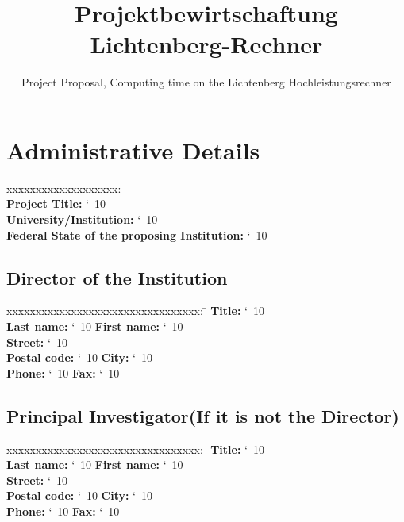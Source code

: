 \documentclass[accentcolor=tud9c,nochapname,11pt]{tudexercise}
\makeatletter
\newcommand\saferead[1]{%
  \bgroup
  \let\do\@makeother
  \dospecials\catcode`\ 10
  \egroup 
}
\makeatother
\begin{document}
\title{Projektbewirtschaftung \\ Lichtenberg-Rechner}
\subtitle{Project Proposal, Computing time on the Lichtenberg Hochleistungsrechner}
\maketitle
\section{Administrative Details}
\begin{Form}
\begin{tabbing}
xxxxxxxxxxxxxxxxxxx: \= \kill  \\%
\textbf{Project Title:}  \saferead{proj_title.txt} \\
\textbf{University/Institution:}  \saferead{prop_inst.txt} \\
\textbf{Federal State of the proposing Institution:}  \saferead{prop_state.txt} \\
\end{tabbing}
\subsection{Director of the Institution}
\begin{tabbing}
xxxxxxxxxxxxxxxxxxxxxxxxxxxxxxxxx:  \= \kill
\textbf{Title:}   \saferead{dir_title.txt} \\
\textbf{Last name:} \saferead{dir_lname.txt}  \> \>  \textbf{First name:} \saferead{dir_fname.txt}  \\
\textbf{Street:} \saferead{dir_street.txt}  \\
\textbf{Postal code:} \saferead{dir_pcode.txt}  \> \> \textbf{City:} \saferead{dir_city.txt}  \\
\textbf{Phone:} \saferead{dir_phone.txt} \> \> \textbf{Fax:} \saferead{dir_fax.txt}  \\
\end{tabbing}
\subsection{Principal Investigator(If it is not the Director)}
\begin{tabbing}
xxxxxxxxxxxxxxxxxxxxxxxxxxxxxxxxx:  \= \kill
\textbf{Title:} \saferead{pi_title.txt} \\
\textbf{Last name:} \saferead{pi_lname.txt}  \> \>  \textbf{First name:} \saferead{pi_fname.txt}  \\
\textbf{Street:} \saferead{pi_street.txt}  \\
\textbf{Postal code:} \saferead{pi_pcode.txt}   \> \> \textbf{City:} \saferead{pi_city.txt}  \\
\textbf{Phone:} \saferead{pi_phone.txt}  \> \> \textbf{Fax:} \saferead{pi_fax.txt}  \\
\end{tabbing}

\end{Form}
\end{document}
